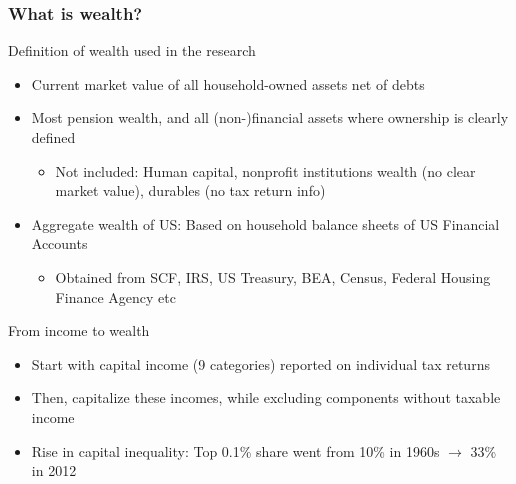\documentclass[aspectratio=169]{beamer}
\begin{document}
\begin{frame}
\frametitle{What is wealth?}
Definition of wealth used in the research
\begin{itemize}\setlength\itemsep{3pt}
\item Current market value of all household-owned assets net of debts
\item Most pension wealth, and all (non-)financial assets where ownership is clearly defined
\begin{itemize}
\item Not included: Human capital, nonprofit institutions wealth (no clear market value), durables (no tax return info)
\end{itemize}
\item Aggregate wealth of US: Based on household balance sheets of US Financial Accounts
\begin{itemize}
\item Obtained from SCF, IRS, US Treasury, BEA, Census, Federal Housing Finance Agency etc
\end{itemize}
\end{itemize}\medskip
From income to wealth
\begin{itemize}\setlength\itemsep{3pt}
\item Start with capital income (9 categories) reported on individual tax returns 
\item Then, capitalize these incomes, while excluding components without taxable income
\item Rise in capital inequality: Top 0.1\% share went from 10\% in 1960s  $\to$ 33\% in 2012
\end{itemize}\medskip
\end{frame}
\end{document}
